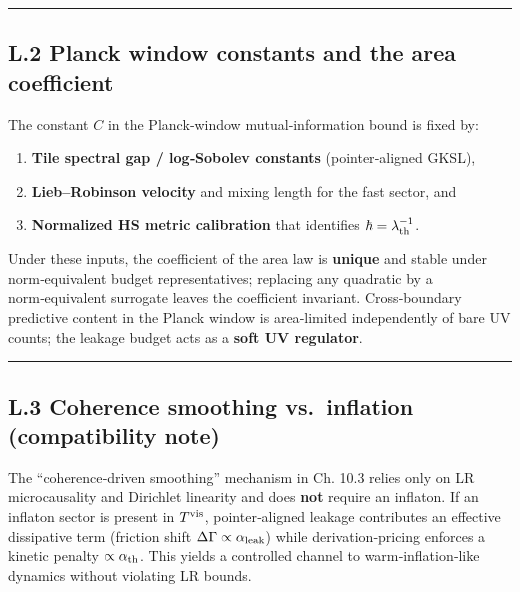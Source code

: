 \documentclass[
]{article}
\providecommand{\tightlist}{%
  \setlength{\itemsep}{0pt}\setlength{\parskip}{0pt}}
\numberwithin{equation}{section}
\begin{document}
\begin{center}\rule{0.5\linewidth}{0.5pt}\end{center}

\hypertarget{l.2-planck-window-constants-and-the-area-coefficient}{%
\subsection{L.2 Planck window constants and the area
coefficient}\label{l.2-planck-window-constants-and-the-area-coefficient}}

The constant \(C\) in the Planck‑window mutual‑information bound is
fixed by:

\begin{enumerate}
\def\labelenumi{\arabic{enumi}.}
\tightlist
\item
  \textbf{Tile spectral gap / log‑Sobolev constants} (pointer‑aligned
  GKSL),
\item
  \textbf{Lieb--Robinson velocity} and mixing length for the fast
  sector, and
\item
  \textbf{Normalized HS metric calibration} that identifies
  \(\hbar=\lambda_{\rm th}^{-1}\).
\end{enumerate}

Under these inputs, the coefficient of the area law is \textbf{unique}
and stable under norm‑equivalent budget representatives; replacing any
quadratic by a norm‑equivalent surrogate leaves the coefficient
invariant. Cross‑boundary predictive content in the Planck window is
area‑limited independently of bare UV counts; the leakage budget acts as
a \textbf{soft UV regulator}.

\begin{center}\rule{0.5\linewidth}{0.5pt}\end{center}

\hypertarget{l.3-coherence-smoothing-vs.-inflation-compatibility-note}{%
\subsection{L.3 Coherence smoothing vs.~inflation (compatibility
note)}\label{l.3-coherence-smoothing-vs.-inflation-compatibility-note}}

The ``coherence‑driven smoothing'' mechanism in Ch. 10.3 relies only on
LR microcausality and Dirichlet linearity and does \textbf{not} require
an inflaton. If an inflaton sector is present in \(T^{\rm vis}\),
pointer‑aligned leakage contributes an effective dissipative term
(friction shift \(\Delta\Gamma\propto\alpha_{\rm leak}\)) while
derivation‑pricing enforces a kinetic penalty
\(\propto\alpha_{\rm th}\). This yields a controlled channel to
warm‑inflation‑like dynamics without violating LR bounds.
\end{document}
